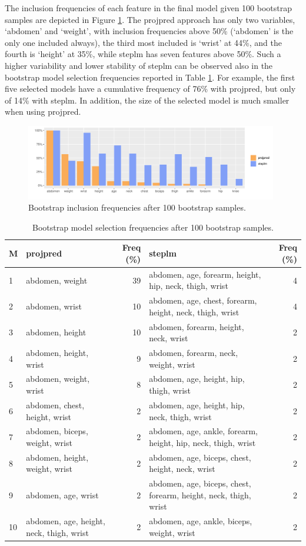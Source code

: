 \documentclass[american,]{article}
\theoremstyle{definition}
\begin{document}
The inclusion frequencies of each feature in the final model given 100
bootstrap samples are depicted in Figure
\ref{fig:inclusion_frequencies}. The projpred approach has only two
variables, `abdomen' and `weight', with inclusion frequencies above
50\% (`abdomen' is the only one included always), the third most
included is `wrist' at 44\%, and the fourth is `height' at 35\%, while
steplm has seven features above 50\%. Such a higher variability and
lower stability of steplm can be observed also in the bootstrap model
selection frequencies reported in Table
\ref{tab:model_frequencies}. For example, the first five selected
models have a cumulative frequency of 76\% with projpred, but only of
14\% with steplm. In addition, the size of the selected model is much
smaller when using projpred.
\begin{figure}[tp]
  \centering
  \includegraphics[width=0.98\textwidth]{graphics/inc_prob.pdf}
  \caption{Bootstrap inclusion frequencies after 100 bootstrap samples.}
  \label{fig:inclusion_frequencies}
\end{figure}


\begin{table}[tp]
\scriptsize
\centering
\begin{tabular}{l||l|r||l|r}
  \hline
M & projpred & Freq (\%) & steplm & Freq (\%)  \\ 
  \hline
1 & abdomen, weight & 39 & abdomen, age, forearm, height, hip, neck, thigh, wrist & 4 \\
2 & abdomen, wrist & 10 & abdomen, age, chest, forearm, height, neck, thigh, wrist & 4 \\
3 & abdomen, height & 10 & abdomen, forearm, height, neck, wrist & 2 \\
4 & abdomen, height, wrist & 9 & abdomen, forearm, neck, weight, wrist & 2 \\
5 & abdomen, weight, wrist & 8 & abdomen, age, height, hip, thigh, wrist & 2 \\
6 & abdomen, chest, height, wrist & 2 & abdomen, age, height, hip, neck, thigh, wrist & 2 \\
7 & abdomen, biceps, weight, wrist & 2 & abdomen, age, ankle, forearm, height, hip, neck, thigh, wrist & 2 \\
8 & abdomen, height, weight, wrist & 2 & abdomen, age, biceps, chest, height, neck, wrist & 2 \\
9 & abdomen, age, wrist & 2 & abdomen, age, biceps, chest, forearm, height, neck, thigh, wrist & 2 \\
10 & abdomen, age, height, neck, thigh, wrist & 2 & abdomen, age, ankle, biceps, weight, wrist & 2 \\
   \hline
\end{tabular}
\caption{Bootstrap model selection frequencies after 100 bootstrap samples.}
\label{tab:model_frequencies}
\end{table}
\end{document}
